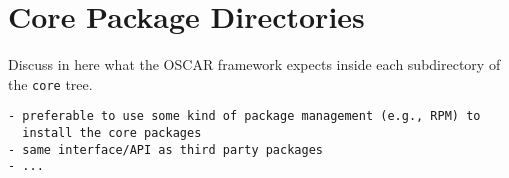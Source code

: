 %
%
%

\section{Core Package Directories}
\label{sec:core-directories}

Discuss in here what the OSCAR framework expects inside each
subdirectory of the {\tt core} tree.

\begin{verbatim}
- preferable to use some kind of package management (e.g., RPM) to 
  install the core packages
- same interface/API as third party packages
- ...
\end{verbatim}

